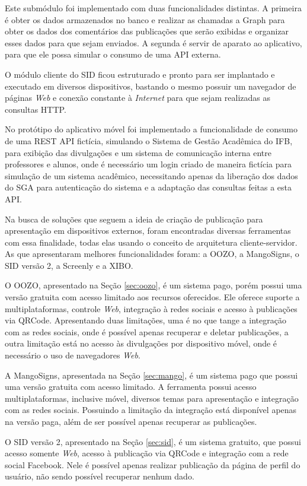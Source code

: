 Este submódulo foi implementado com duas funcionalidades distintas. A primeira é obter os dados armazenados no banco e realizar as chamadas a Graph para obter os dados dos comentários das publicações que serão exibidas e organizar esses dados para que sejam enviados. A segunda é servir de aparato ao aplicativo, para que ele possa simular o consumo de uma API externa. 

O módulo cliente do SID ficou estruturado e pronto para ser implantado e executado em diversos dispositivos, bastando o mesmo possuir um navegador de páginas \textit{Web} e conexão constante à \textit{Internet} para que sejam realizadas as consultas HTTP.

No protótipo do aplicativo móvel foi implementado a funcionalidade de consumo de uma REST API fictícia, simulando o Sistema de Gestão Acadêmica do IFB, para exibição das divulgações e um sistema de comunicação interna entre professores e alunos, onde é necessário um login criado de maneira fictícia para simulação de um sistema acadêmico, necessitando apenas da liberação dos dados do SGA para autenticação do sistema e a adaptação das consultas feitas a esta API.

Na busca de soluções que seguem a ideia de criação de publicação para apresentação em dispositivos externos, foram encontradas diversas ferramentas com essa finalidade, todas elas usando o conceito de arquitetura cliente-servidor. As que apresentaram melhores funcionalidades foram: a OOZO, a MangoSigns, o SID versão 2, a Screenly e a XIBO.

O OOZO, apresentado na Seção \ref{sec:oozo}, é um sistema pago, porém possui uma versão gratuita com acesso limitado aos recursos oferecidos. Ele oferece suporte a multiplataformas, controle \textit{Web}, integração à redes sociais e acesso à publicações via QRCode. Apresentando duas limitações, uma é no que tange a integração com as redes sociais, onde é possível apenas recuperar e deletar publicações, a outra limitação está no acesso às divulgações por dispositivo móvel, onde é necessário o uso de navegadores \textit{Web}. 

A MangoSigns, apresentada na Seção \ref{sec:mango}, é um sistema pago que possui uma versão gratuita com acesso limitado. A ferramenta possui acesso multiplataformas, inclusive móvel, diversos temas para apresentação e integração com as redes sociais. Possuindo a limitação da integração está disponível apenas na versão paga, além de ser possível apenas recuperar as publicações.

O SID versão 2, apresentado na Seção \ref{sec:sid}, é um sistema gratuito, que possui acesso somente \textit{Web}, acesso à publicação via QRCode e integração com a rede social Facebook. Nele é possível apenas realizar publicação da página de perfil do usuário, não sendo possível recuperar nenhum dado.


